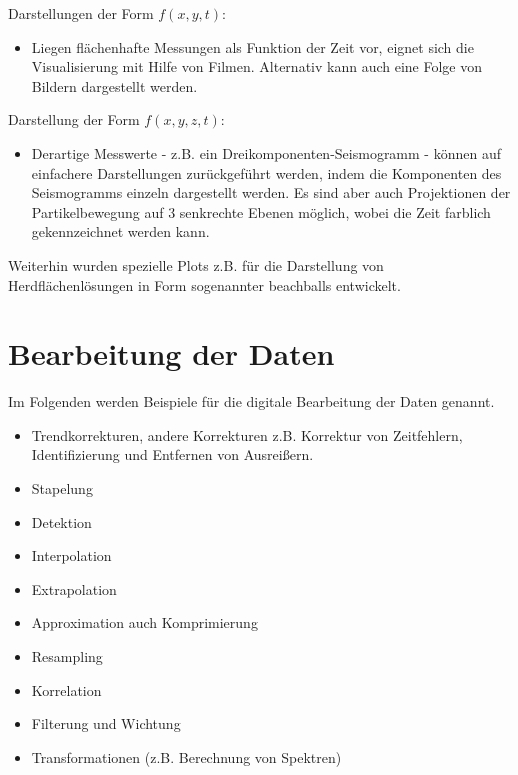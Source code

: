 \noindent Darstellungen der Form $f(x,y,t)$: \begin{itemize}
\item Liegen flächenhafte Messungen als Funktion der Zeit vor, eignet sich die Visualisierung mit Hilfe von Filmen. Alternativ kann auch eine Folge von Bildern dargestellt werden.  
  \end{itemize}
  
\noindent Darstellung der Form $f(x,y,z,t)$:
\begin{itemize}
\item Derartige Messwerte - z.B. ein Dreikomponenten-Seismogramm - können auf einfachere Darstellungen zurückgeführt werden, indem die Komponenten des Seismogramms einzeln dargestellt werden. Es sind aber auch Projektionen der Partikelbewegung auf 3 senkrechte Ebenen möglich, wobei die Zeit farblich gekennzeichnet werden kann.
\end{itemize}
Weiterhin wurden spezielle Plots z.B. für die Darstellung von Herdflächenlösungen in Form sogenannter beachballs entwickelt. 

\section{Bearbeitung der Daten}
Im Folgenden werden Beispiele für die digitale Bearbeitung der Daten genannt.
\begin{itemize}
\item Trendkorrekturen, andere Korrekturen z.B. Korrektur von Zeitfehlern, Identifizierung und Entfernen von Ausreißern. 
\item Stapelung
\item Detektion
\item Interpolation
\item Extrapolation
\item Approximation auch Komprimierung
\item Resampling
\item Korrelation
\item Filterung und Wichtung
\item Transformationen (z.B. Berechnung von Spektren)
  \end{itemize}

